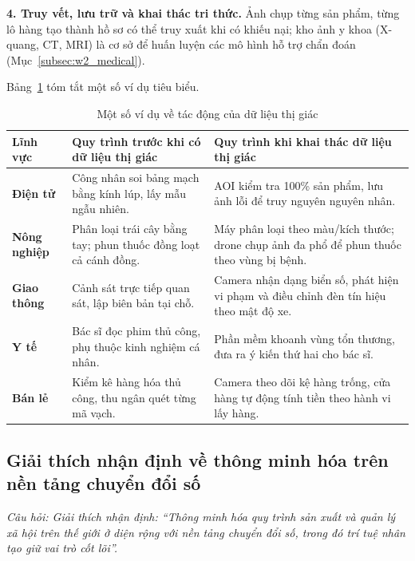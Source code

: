 \textbf{4. Truy vết, lưu trữ và khai thác tri thức.} Ảnh chụp từng sản phẩm, từng lô hàng tạo thành hồ sơ có thể truy xuất khi có khiếu nại; kho ảnh y khoa (X-quang, CT, MRI) là cơ sở để huấn luyện các mô hình hỗ trợ chẩn đoán (Mục~\ref{subsec:w2_medical}).

Bảng~\ref{tab:w1_impact} tóm tắt một số ví dụ tiêu biểu.

\begin{table}[ht]
\centering
\small
\caption{Một số ví dụ về tác động của dữ liệu thị giác}
\label{tab:w1_impact}
\renewcommand{\arraystretch}{1.3}
\begin{tabularx}{\textwidth}{|p{2.6cm}|X|X|}
\hline
\textbf{Lĩnh vực} & \textbf{Quy trình trước khi có dữ liệu thị giác} & \textbf{Quy trình khi khai thác dữ liệu thị giác} \\
\hline
\textbf{Điện tử} & Công nhân soi bảng mạch bằng kính lúp, lấy mẫu ngẫu nhiên. & AOI kiểm tra 100\% sản phẩm, lưu ảnh lỗi để truy nguyên nguyên nhân. \\
\hline
\textbf{Nông nghiệp} & Phân loại trái cây bằng tay; phun thuốc đồng loạt cả cánh đồng. & Máy phân loại theo màu/kích thước; drone chụp ảnh đa phổ để phun thuốc theo vùng bị bệnh. \\
\hline
\textbf{Giao thông} & Cảnh sát trực tiếp quan sát, lập biên bản tại chỗ. & Camera nhận dạng biển số, phát hiện vi phạm và điều chỉnh đèn tín hiệu theo mật độ xe. \\
\hline
\textbf{Y tế} & Bác sĩ đọc phim thủ công, phụ thuộc kinh nghiệm cá nhân. & Phần mềm khoanh vùng tổn thương, đưa ra ý kiến thứ hai cho bác sĩ. \\
\hline
\textbf{Bán lẻ} & Kiểm kê hàng hóa thủ công, thu ngân quét từng mã vạch. & Camera theo dõi kệ hàng trống, cửa hàng tự động tính tiền theo hành vi lấy hàng. \\
\hline
\end{tabularx}
\end{table}

\subsection{Giải thích nhận định về thông minh hóa trên nền tảng chuyển đổi số}
\label{subsec:w1_smart}

\textit{Câu hỏi: Giải thích nhận định: ``Thông minh hóa quy trình sản xuất và quản lý xã hội trên thế giới ở diện rộng với nền tảng chuyển đổi số, trong đó trí tuệ nhân tạo giữ vai trò cốt lõi''.}

